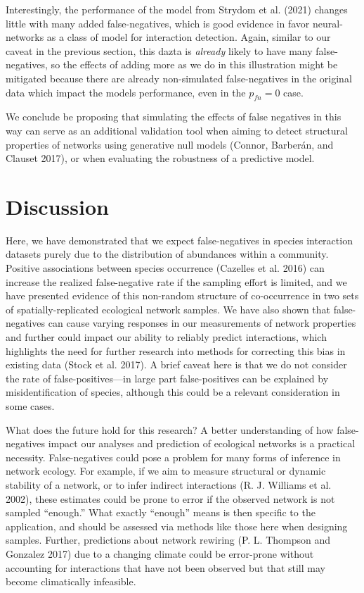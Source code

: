 \documentclass[11pt]{article}
\begin{document}
Interestingly, the performance of the model from Strydom et al. (2021)
changes little with many added false-negatives, which is good evidence
in favor neural-networks as a class of model for interaction detection.
Again, similar to our caveat in the previous section, this dazta is
\emph{already} likely to have many false-negatives, so the effects of
adding more as we do in this illustration might be mitigated because
there are already non-simulated false-negatives in the original data
which impact the models performance, even in the \(p_{fn} = 0\) case.

We conclude be proposing that simulating the effects of false negatives
in this way can serve as an additional validation tool when aiming to
detect structural properties of networks using generative null models
(Connor, Barberán, and Clauset 2017), or when evaluating the robustness
of a predictive model.

\hypertarget{discussion}{%
\section{Discussion}\label{discussion}}

Here, we have demonstrated that we expect false-negatives in species
interaction datasets purely due to the distribution of abundances within
a community. Positive associations between species occurrence (Cazelles
et al. 2016) can increase the realized false-negative rate if the
sampling effort is limited, and we have presented evidence of this
non-random structure of co-occurrence in two sets of
spatially-replicated ecological network samples. We have also shown that
false-negatives can cause varying responses in our measurements of
network properties and further could impact our ability to reliably
predict interactions, which highlights the need for further research
into methods for correcting this bias in existing data (Stock et al.
2017). A brief caveat here is that we do not consider the rate of
false-positives---in large part false-positives can be explained by
misidentification of species, although this could be a relevant
consideration in some cases.

What does the future hold for this research? A better understanding of
how false-negatives impact our analyses and prediction of ecological
networks is a practical necessity. False-negatives could pose a problem
for many forms of inference in network ecology. For example, if we aim
to measure structural or dynamic stability of a network, or to infer
indirect interactions (R. J. Williams et al. 2002), these estimates
could be prone to error if the observed network is not sampled
``enough.'' What exactly ``enough'' means is then specific to the
application, and should be assessed via methods like those here when
designing samples. Further, predictions about network rewiring (P. L.
Thompson and Gonzalez 2017) due to a changing climate could be
error-prone without accounting for interactions that have not been
observed but that still may become climatically infeasible.
\end{document}
